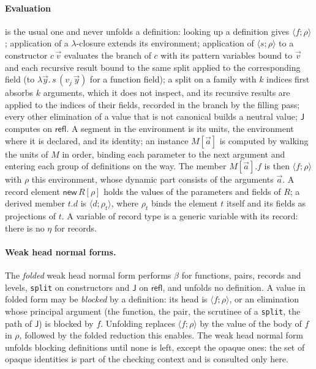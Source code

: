 \documentclass[11pt]{article}
\newcommand{\kw}[1]{\texttt{#1}}
\theoremstyle{remark}
\begin{document}
\paragraph{Evaluation} is the usual one and never unfolds a definition:
looking up a definition gives $\langle f;\rho\rangle$; application of a
$\lambda$-closure extends its environment; application of
$\langle s;\rho\rangle$ to a constructor $c\,\vec v$ evaluates the
branch of $c$ with its pattern variables bound to $\vec v$ and each
recursive result bound to the same split applied to the corresponding
field (to $\lambda\vec y.\,s\,(v_j\,\vec y)$ for a function field); a
split on a family with $k$ indices first absorbs $k$ arguments, which it
does not inspect, and its recursive results are applied to the indices
of their fields, recorded in the branch by the filling pass; every
other elimination of a value that is not canonical builds a neutral
value; $\mathsf J$ computes on $\mathsf{refl}$. A segment in the
environment is its units, the environment where it is declared, and its
identity; an instance $M[\vec a]$ is computed by walking the units of
$M$ in order, binding each parameter to the next argument and entering
each group of definitions on the way. The member $M[\vec a].f$ is then
$\langle f;\rho\rangle$ with $\rho$ this environment, whose dynamic part
consists of the arguments $\vec a$. A record element $\mathsf{new}\,R[\rho]$
holds the values of the parameters and fields of $R$; a derived member
$t.d$ is $\langle d;\rho_t\rangle$, where $\rho_t$ binds the element $t$
itself and its fields as projections of $t$. A variable of record type
is a generic variable with its record: there is no $\eta$ for records.

\paragraph{Weak head normal forms.} The \emph{folded} weak head normal
form performs $\beta$ for functions, pairs, records and levels,
\kw{split} on constructors and $\mathsf J$ on $\mathsf{refl}$, and
unfolds no definition. A value in folded form may be \emph{blocked} by
a definition: its head is $\langle f;\rho\rangle$, or an elimination
whose principal argument (the function, the pair, the scrutinee of a
\kw{split}, the path of $\mathsf J$) is blocked by $f$. Unfolding replaces
$\langle f;\rho\rangle$ by the value of the body of $f$ in $\rho$,
followed by the folded reduction this enables. The weak head normal form
unfolds blocking definitions until none is left, except the opaque
ones: the set of opaque identities is part of the checking context and
is consulted only here.
\end{document}
